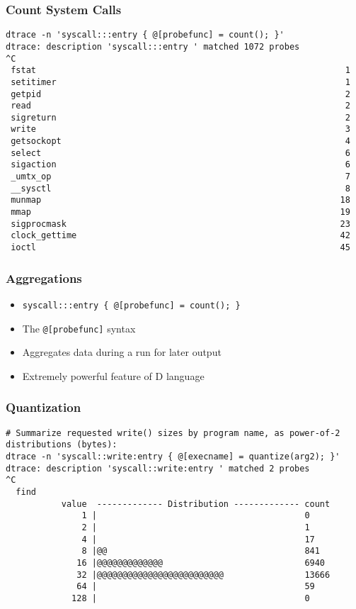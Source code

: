 \documentclass[pdftex]{beamer}
\begin{document}
\begin{frame}[fragile]
  \frametitle{Count System Calls}
\begin{lstlisting}
dtrace -n 'syscall:::entry { @[probefunc] = count(); }'
dtrace: description 'syscall:::entry ' matched 1072 probes
^C
 fstat                                                             1
 setitimer                                                         1
 getpid                                                            2
 read                                                              2
 sigreturn                                                         2
 write                                                             3
 getsockopt                                                        4
 select                                                            6
 sigaction                                                         6
 _umtx_op                                                          7
 __sysctl                                                          8
 munmap                                                           18
 mmap                                                             19
 sigprocmask                                                      23
 clock_gettime                                                    42
 ioctl                                                            45
\end{lstlisting}
\end{frame}

\begin{frame}[fragile]
  \frametitle{Aggregations}
  \begin{itemize}
  \item \verb+syscall:::entry { @[probefunc] = count(); }+
  \item The \verb+@[probefunc]+ syntax
  \item Aggregates data during a run for later output
  \item Extremely powerful feature of D language
  \end{itemize}
\end{frame}

\begin{frame}[fragile]
  \frametitle{Quantization}
\begin{lstlisting}
# Summarize requested write() sizes by program name, as power-of-2 distributions (bytes):
dtrace -n 'syscall::write:entry { @[execname] = quantize(arg2); }'
dtrace: description 'syscall::write:entry ' matched 2 probes
^C
  find                                              
           value  ------------- Distribution ------------- count    
               1 |                                         0        
               2 |                                         1        
               4 |                                         17       
               8 |@@                                       841      
              16 |@@@@@@@@@@@@@                            6940     
              32 |@@@@@@@@@@@@@@@@@@@@@@@@@                13666    
              64 |                                         59       
             128 |                                         0        
\end{lstlisting}
\end{frame}
\end{document}
